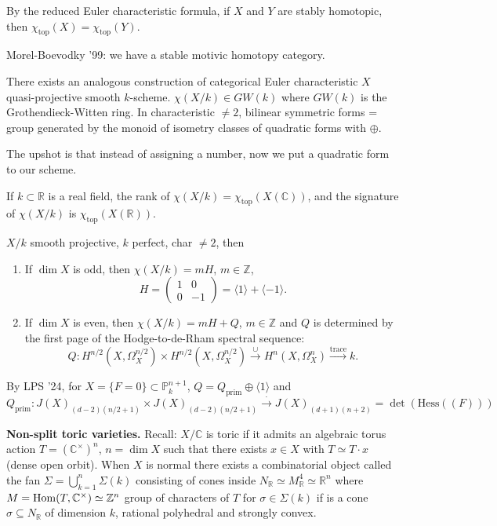 \noindent
By the reduced Euler characteristic formula,
if $X$ and $Y$ are stably homotopic,
then $\chi_{\operatorname{top}}(X)
=\chi_{\operatorname{top}}(Y)$.

\medskip\noindent
Morel-Boevodky '99: we have
a stable motivic homotopy category.

There exists an analogous construction
of categorical Euler characteristic
$X$ quasi-projective smooth $k$-scheme.
$\chi(X/k) \in GW(k)$
where $GW(k)$ is the Grothendieck-Witten
ring. In characteristic $\neq 2$, 
bilinear symmetric forms = group
generated by the monoid of isometry
classes of quadratic forms with $\oplus$.

The upshot is that instead
of assigning a number, now we put
a quadratic form to our scheme.

\begin{remark}
\label{remark-real-field-euler}
If $k \subset \mathbb{R}$ is a real field,
the rank of $\chi(X/k) =
\chi_{\operatorname{top}}(X(\mathbb{C}))$,
and the signature of $\chi(X/k)$
is
$\chi_{\operatorname{top}}(X(\mathbb{R}))$.
\end{remark}

\begin{theorem}[Levine '20]
\label{theorem-levine20}
$X/k$ smooth projective, $k$ perfect,
char $\neq 2$, then
\begin{enumerate}
\item If $\dim X$ is odd, then
$\chi(X/k) = mH$, $m \in \mathbb{Z}$,
$$
H=\begin{pmatrix}1&0\\ 0&-1\end{pmatrix}
=\langle 1\rangle+ \langle-1\rangle.
$$
\item If $\dim X$ is even, then
$\chi(X/k)=mH+Q$, $m \in \mathbb{Z}$
and $Q$ is determined by the first
page of the Hodge-to-de-Rham spectral
sequence:
$$
Q: H^{n/2}(X,\Omega^{n/2}_X)\times
H^{n/2}(X,\Omega_X^{n/2})
\xrightarrow{\cup }
H^n(X,\Omega_X^n)
\xrightarrow{\operatorname{trace}}k.
$$
\end{enumerate}
\end{theorem}

\noindent
By LPS '24, for $X = \{F=0\}
\subset \mathbb{P}^{n+1}_k$,
$Q = Q_{\operatorname{prim}} \oplus
\langle 1\rangle$ and
$$
Q_{\operatorname{prim}}:
J(X) _{(d-2)(n/2+1)}\times
J(X)_{(d-2)(n/2+1)}\xrightarrow{\cdot}
J(X)_{(d+1)(n+2)}
=\det (\text{Hess}((F)))
$$

\medskip\noindent
{\bf Non-split toric varieties.}
Recall: $X/\mathbb{C}$ is toric
if it admits an algebraic torus action
$T = (\mathbb{C}^\times)^n$, $n = \dim X$
such that there exists $x \in X$
with $T \simeq T\cdot x$ (dense open orbit).
When $X$ is normal there exists a
combinatorial object called the fan
$\Sigma = \bigcup_{k=1}^n \Sigma(k)$
consisting of cones inside $N_{\mathbb{R}}
\simeq M^4_{\mathbb{R}} \simeq \mathbb{R}^n$
where $M = \mathop{\mathrm{Hom}}\nolimits(T,\mathbb{C}^\times)
\simeq \mathbb{Z}^n$
group of characters of $T$
for $\sigma \in \Sigma(k)$
if is a cone $\sigma \subseteq N_{\mathbb{R}}$
of dimension $k$, rational polyhedral
and strongly convex.

